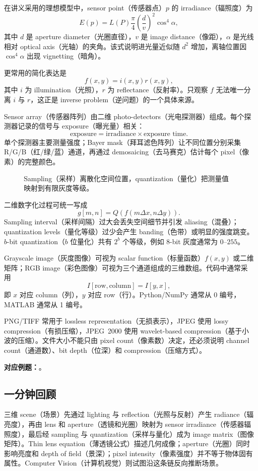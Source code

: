 在讲义采用的理想模型中，sensor point（传感器点）$p$ 的 irradiance（辐照度）为
\[
  E(p)=L(P)\frac{\pi}{4}\left(\frac{d}{v}\right)^2\cos^4\alpha,
\]
其中 $d$ 是 aperture diameter（光圈直径），$v$ 是 image distance（像距），$\alpha$ 是光线相对 optical axis（光轴）的夹角。该式说明进光量近似随 $d^2$ 增加，离轴位置因 $\cos^4\alpha$ 出现 vignetting（暗角）。

更常用的简化表达是
\[
  f(x,y)=i(x,y)r(x,y),
\]
其中 $i$ 为 illumination（光照），$r$ 为 reflectance（反射率）。只观察 $f$ 无法唯一分离 $i$ 与 $r$，这正是 inverse problem（逆问题）的一个具体来源。


Sensor array（传感器阵列）由二维 photo-detectors（光电探测器）组成。每个探测器记录的信号与 exposure（曝光量）相关：
\[
  \text{exposure}=\text{irradiance}\times\text{exposure time}.
\]
单个探测器主要测量强度；Bayer mask（拜耳滤色阵列）让不同位置分别采集 R/G/B（红/绿/蓝）通道，再通过 demosaicing（去马赛克）估计每个 pixel（像素）的完整颜色。

\begin{figure}[htbp]
  \centering
  \resizebox{0.94\textwidth}{!}{}
  \caption{Sampling（采样）离散化空间位置，quantization（量化）把测量值映射到有限灰度等级。}
  \label{fig:sc4061-l01-sampling-quantization}
\end{figure}

二维数字化过程可统一写成
\[
  \boxed{g[m,n]=Q\!\left(f(m\Delta x,n\Delta y)\right)}.
\]
Sampling interval（采样间隔）过大会丢失空间细节并引发 aliasing（混叠）；quantization levels（量化等级）过少会产生 banding（色带）或明显的强度跳变。$b$-bit quantization（$b$ 位量化）共有 $2^b$ 个等级，例如 8-bit 灰度通常为 $0$--$255$。

Grayscale image（灰度图像）可视为 scalar function（标量函数）$f(x,y)$ 或二维矩阵；RGB image（彩色图像）可视为三个通道组成的三维数组。代码中通常采用
\[
  \boxed{I[\text{row},\text{column}]=I[y,x]},
\]
即 $x$ 对应 column（列），$y$ 对应 row（行）。Python/NumPy 通常从 0 编号，MATLAB 通常从 1 编号。

PNG/TIFF 常用于 lossless representation（无损表示），JPEG 使用 lossy compression（有损压缩），JPEG~2000 使用 wavelet-based compression（基于小波的压缩）。文件大小不能只由 pixel count（像素数）决定，还必须说明 channel count（通道数）、bit depth（位深）和 compression（压缩方式）。

\textbf{对应例题：}。

\subsection{一分钟回顾}

三维 scene（场景）先通过 lighting 与 reflection（光照与反射）产生 radiance（辐亮度），再由 lens 和 aperture（透镜和光圈）映射为 sensor irradiance（传感器辐照度），最后经 sampling 与 quantization（采样与量化）成为 image matrix（图像矩阵）。Thin lens equation（薄透镜公式）描述几何成像；aperture（光圈）同时影响亮度和 depth of field（景深）；pixel intensity（像素强度）并不等于物体固有属性。Computer Vision（计算机视觉）则试图沿这条链反向推断场景。

